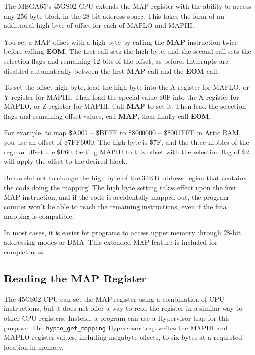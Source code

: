 The MEGA65's 45GS02 CPU extends the MAP register with the ability to access any
256 byte block in the 28-bit address space. This takes the form of an
additional high byte of offset for each of MAPLO and MAPHI.

You set a MAP offset with a high byte by calling the {\bf MAP} instruction twice
before calling {\bf EOM}. The first call sets the high byte, and the second
call sets the selection flags and remaining 12 bits of the offset, as before.
Interrupts are disabled automatically between the first {\bf MAP} call and the
{\bf EOM} call.

To set the offset high byte, load the high byte into the A register for MAPLO,
or Y register for MAPHI. Then load the special value \$0F into the X register
for MAPLO, or Z register for MAPHI. Call {\bf MAP} to set it. Then load the
selection flags and remaining offset values, call {\bf MAP}, then finally call
{\bf EOM}.

For example, to map \$A000 -- \$BFFF to \$8000000 -- \$8001FFF in Attic RAM,
you use an offset of \$7FF6000. The high byte is \$7F, and the three nibbles
of the regular offset are \$F60. Setting MAPHI to this offset with
the selection flag of \$2 will apply the offset to the desired block.


Be careful not to change the high byte of the 32KB address region that contains
the code doing the mapping! The high byte setting takes effect upon the first
MAP instruction, and if the code is accidentally mapped out, the program
counter won't be able to reach the remaining instructions, even if the final
mapping is compatible.

In most cases, it is easier for programs to access upper memory through 28-bit
addressing modes or DMA. This extended MAP feature is included for completeness.

\subsection{Reading the MAP Register}

The 45GS02 CPU can set the MAP register using a combination of CPU
instructions, but it does not offer a way to read the register in a similar
way to other CPU registers. Instead, a program can use a Hypervisor trap
for this purpose. The {\tt hyppo\_get\_mapping} Hypervisor trap writes the MAPHI
and MAPLO register values, including megabyte offsets, to six bytes at a
requested location in memory.

